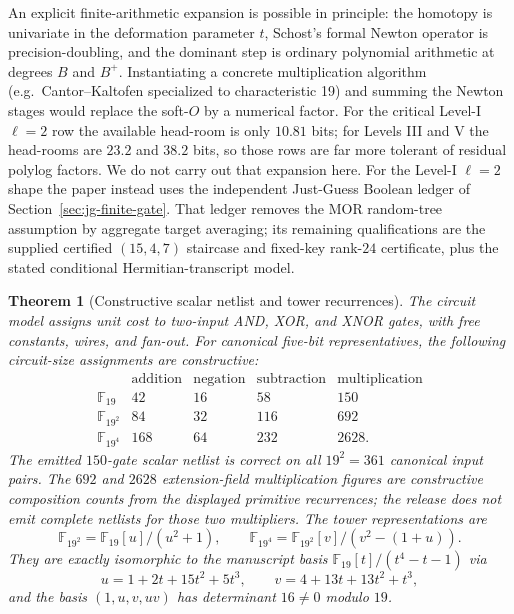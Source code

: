 \documentclass[11pt]{article}
\newtheorem{theorem}{Theorem}[section]
\newcommand{\F}{\mathbb F}
\begin{document}
An explicit finite-arithmetic expansion is possible in principle: the
homotopy is univariate in the deformation parameter $t$, Schost's formal
Newton operator is precision-doubling, and the dominant step is ordinary
polynomial arithmetic at degrees $B$ and $B^+$.  Instantiating a concrete
multiplication algorithm (e.g.\ Cantor--Kaltofen specialized to characteristic
19) and summing the Newton stages would replace the soft-$O$ by a numerical
factor.  For the critical Level-I $\ell=2$ row the available head-room is
only $10.81$ bits; for Levels III and V the head-rooms are $23.2$ and
$38.2$ bits, so those rows are far more tolerant of residual polylog factors.
We do not carry out that expansion here.  For the Level-I $\ell=2$ shape the
paper instead uses the independent Just-Guess Boolean ledger of
Section~\ref{sec:jg-finite-gate}.  That ledger removes the MOR random-tree
assumption by aggregate target averaging; its remaining qualifications are the
supplied certified $(15,4,7)$ staircase and fixed-key rank-$24$ certificate, plus
the stated conditional Hermitian-transcript model.

\begin{theorem}[Constructive scalar netlist and tower recurrences]
\label{thm:sq-circuits}
The circuit model assigns unit cost to two-input AND, XOR, and XNOR gates,
with free constants, wires, and fan-out.  For canonical five-bit
representatives, the following circuit-size assignments are constructive:
\[
\begin{array}{c|rrrr}
 &\text{addition}&\text{negation}&\text{subtraction}&\text{multiplication}\\
\hline
\F_{19}   &42&16&58&150\\
\F_{19^2} &84&32&116&692\\
\F_{19^4} &168&64&232&2628.
\end{array}
\]
The emitted $150$-gate scalar netlist is correct on all $19^2=361$ canonical
input pairs.  The $692$ and $2628$ extension-field multiplication figures are
constructive composition counts from the displayed primitive recurrences;
the release does not emit complete netlists for those two multipliers.  The
tower representations are
\[
 \F_{19^2}=\F_{19}[u]/(u^2+1),\qquad
 \F_{19^4}=\F_{19^2}[v]/(v^2-(1+u)).
\]
They are exactly isomorphic to the manuscript basis
$\F_{19}[t]/(t^4-t-1)$ via
\[
 u=1+2t+15t^2+5t^3,\qquad
 v=4+13t+13t^2+t^3,
\]
and the basis $(1,u,v,uv)$ has determinant $16\ne0$ modulo $19$.
\end{theorem}
\end{document}
